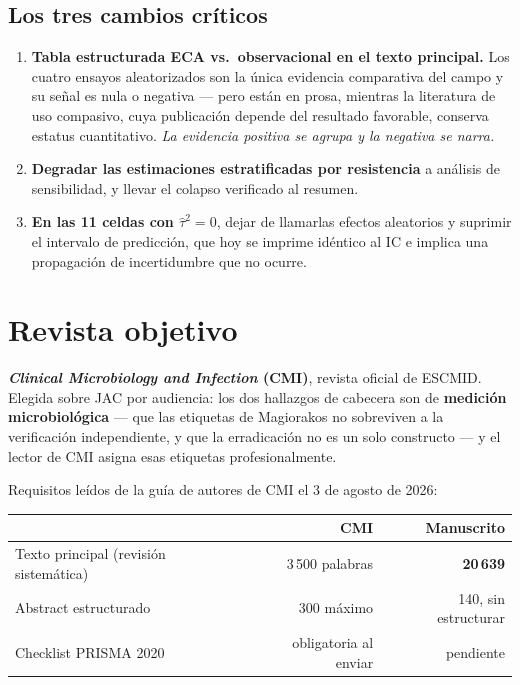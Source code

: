 \documentclass[11pt,a4paper]{article}
\begin{document}
\subsection{Los tres cambios críticos}

\begin{enumerate}[leftmargin=1.5em,itemsep=3pt]
\item \textbf{Tabla estructurada ECA vs.\ observacional en el texto principal.}
Los cuatro ensayos aleatorizados son la única evidencia comparativa del campo y
su señal es nula o negativa --- pero están en prosa, mientras la literatura de
uso compasivo, cuya publicación depende del resultado favorable, conserva estatus
cuantitativo. \emph{La evidencia positiva se agrupa y la negativa se narra.}
\item \textbf{Degradar las estimaciones estratificadas por resistencia} a
análisis de sensibilidad, y llevar el colapso verificado al resumen.
\item \textbf{En las 11 celdas con $\hat\tau^2 = 0$}, dejar de llamarlas efectos
aleatorios y suprimir el intervalo de predicción, que hoy se imprime idéntico al
IC e implica una propagación de incertidumbre que no ocurre.
\end{enumerate}

\section{Revista objetivo}

\textbf{\textit{Clinical Microbiology and Infection} (CMI)}, revista oficial de
ESCMID. Elegida sobre JAC por audiencia: los dos hallazgos de cabecera son de
\textbf{medición microbiológica} --- que las etiquetas de Magiorakos no
sobreviven a la verificación independiente, y que la erradicación no es un solo
constructo --- y el lector de CMI asigna esas etiquetas profesionalmente.

Requisitos leídos de la guía de autores de CMI el 3 de agosto de 2026:

\begin{center}
\begin{tabular}{@{}lrr@{}}
\toprule
 & \textbf{CMI} & \textbf{Manuscrito} \\
\midrule
Texto principal (revisión sistemática) & 3\,500 palabras & \textcolor{warn}{\textbf{20\,639}} \\
Abstract estructurado & 300 máximo & 140, sin estructurar \\
Checklist PRISMA 2020 & obligatoria al enviar & pendiente \\
\bottomrule
\end{tabular}
\end{center}
\end{document}
